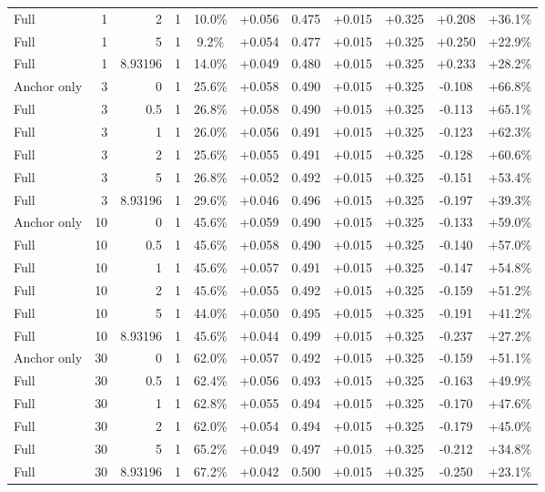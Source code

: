 \begin{table}[htbp]
\begin{tabular}{lrrrccccccc}
Full & 1 & 2 & 1 & 10.0\% & +0.056 & 0.475 & +0.015 & +0.325 & +0.208 & +36.1\% \\
Full & 1 & 5 & 1 & 9.2\% & +0.054 & 0.477 & +0.015 & +0.325 & +0.250 & +22.9\% \\
Full & 1 & 8.93196 & 1 & 14.0\% & +0.049 & 0.480 & +0.015 & +0.325 & +0.233 & +28.2\% \\
Anchor only & 3 & 0 & 1 & 25.6\% & +0.058 & 0.490 & +0.015 & +0.325 & -0.108 & +66.8\% \\
Full & 3 & 0.5 & 1 & 26.8\% & +0.058 & 0.490 & +0.015 & +0.325 & -0.113 & +65.1\% \\
Full & 3 & 1 & 1 & 26.0\% & +0.056 & 0.491 & +0.015 & +0.325 & -0.123 & +62.3\% \\
Full & 3 & 2 & 1 & 25.6\% & +0.055 & 0.491 & +0.015 & +0.325 & -0.128 & +60.6\% \\
Full & 3 & 5 & 1 & 26.8\% & +0.052 & 0.492 & +0.015 & +0.325 & -0.151 & +53.4\% \\
Full & 3 & 8.93196 & 1 & 29.6\% & +0.046 & 0.496 & +0.015 & +0.325 & -0.197 & +39.3\% \\
Anchor only & 10 & 0 & 1 & 45.6\% & +0.059 & 0.490 & +0.015 & +0.325 & -0.133 & +59.0\% \\
Full & 10 & 0.5 & 1 & 45.6\% & +0.058 & 0.490 & +0.015 & +0.325 & -0.140 & +57.0\% \\
Full & 10 & 1 & 1 & 45.6\% & +0.057 & 0.491 & +0.015 & +0.325 & -0.147 & +54.8\% \\
Full & 10 & 2 & 1 & 45.6\% & +0.055 & 0.492 & +0.015 & +0.325 & -0.159 & +51.2\% \\
Full & 10 & 5 & 1 & 44.0\% & +0.050 & 0.495 & +0.015 & +0.325 & -0.191 & +41.2\% \\
Full & 10 & 8.93196 & 1 & 45.6\% & +0.044 & 0.499 & +0.015 & +0.325 & -0.237 & +27.2\% \\
Anchor only & 30 & 0 & 1 & 62.0\% & +0.057 & 0.492 & +0.015 & +0.325 & -0.159 & +51.1\% \\
Full & 30 & 0.5 & 1 & 62.4\% & +0.056 & 0.493 & +0.015 & +0.325 & -0.163 & +49.9\% \\
Full & 30 & 1 & 1 & 62.8\% & +0.055 & 0.494 & +0.015 & +0.325 & -0.170 & +47.6\% \\
Full & 30 & 2 & 1 & 62.0\% & +0.054 & 0.494 & +0.015 & +0.325 & -0.179 & +45.0\% \\
Full & 30 & 5 & 1 & 65.2\% & +0.049 & 0.497 & +0.015 & +0.325 & -0.212 & +34.8\% \\
Full & 30 & 8.93196 & 1 & 67.2\% & +0.042 & 0.500 & +0.015 & +0.325 & -0.250 & +23.1\% \\

\end{tabular}
\end{table}
